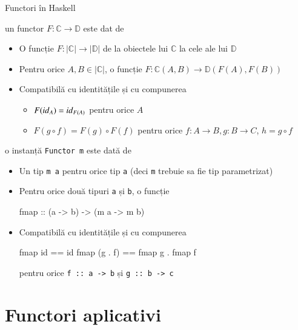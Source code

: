 \documentclass[xcolor=pdftex,romanian,colorlinks]{beamer}
\begin{document}
\begin{frame}[fragile]{Functori în Haskell}

 un functor $F : \mathbb{C} \rightarrow \mathbb{D}$ este dat de
\begin{itemize}
\item O funcție $F : |\mathbb{C}| \rightarrow |\mathbb{D}|$ de la obiectele lui $\mathbb{C}$ la cele ale lui $\mathbb{D}$
\item Pentru orice $A,B \in |\mathbb{C}|$, o funcție $F : \mathbb{C}(A,B) \rightarrow \mathbb{D}(F(A),F(B))$
\item Compatibilă cu identitățile și cu compunerea
\begin{itemize}
\item $F({\it id}_A) = {\it id}_{F(A)}$ pentru orice $A$
\item $F(g\circ f) = F(g)\circ F(f)$ pentru orice $f : A \rightarrow B,g: B \rightarrow C$, $h = g\circ f$
\end{itemize}
\end{itemize}

\vfill
{}
 o instanță \lstinline$Functor m$ este dată de
\begin{itemize}
\item Un tip \lstinline$m a$ pentru orice tip \lstinline$a$ (deci \lstinline$m$ trebuie sa fie tip parametrizat)
\item Pentru orice două tipuri \lstinline$a$ și \lstinline$b$, o funcție 
\begin{asciihs}
fmap :: (a -> b) -> (m a -> m b)
\end{asciihs}
\item Compatibilă cu identitățile și cu compunerea
\begin{asciihs}
fmap id == id
fmap (g . f) == fmap g . fmap f 
\end{asciihs}
\hfill pentru orice \lstinline$f :: a -> b$ și \lstinline$g :: b -> c$
\end{itemize}
\end{frame}


\section{Functori aplicativi}
\end{document}
